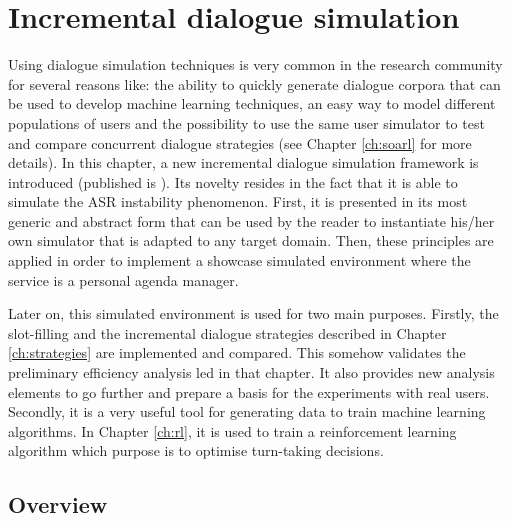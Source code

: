 \chapter{Incremental dialogue simulation}
\label{ch:simulation}

	
	Using dialogue simulation techniques is very common in the research community \cite{Eckert1997,Pietquin2006} for several reasons like: the ability to quickly generate dialogue corpora that can be used to develop machine learning techniques, an easy way to model different populations of users and the possibility to use the same user simulator to test and compare concurrent dialogue strategies (see Chapter \ref{ch:soarl} for more details). In this chapter, a new incremental dialogue simulation framework is introduced (published is \cite{Khouzaimi2016a}). Its novelty resides in the fact that it is able to simulate the ASR instability phenomenon. First, it is presented in its most generic and abstract form that can be used by the reader to instantiate his/her own simulator that is adapted to any target domain. Then, these principles are applied in order to implement a showcase simulated environment where the service is a personal agenda manager.
	
	Later on, this simulated environment is used for two main purposes. Firstly, the slot-filling and the incremental dialogue strategies described in Chapter \ref{ch:strategies} are implemented and compared. This somehow validates the preliminary efficiency analysis led in that chapter. It also provides new analysis elements to go further and prepare a basis for the experiments with real users. Secondly, it is a very useful tool for generating data to train machine learning algorithms. In Chapter \ref{ch:rl}, it is used to train a reinforcement learning algorithm which purpose is to optimise turn-taking decisions.
						
\section{Overview}
	

